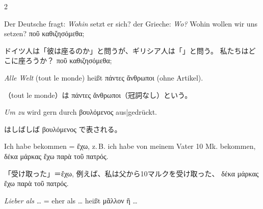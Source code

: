 \begin{paracol}{2}
\begin{enumerate}[leftmargin=0pt,rightmargin=0pt,listparindent =1cm,labelindent=1cm,labelsep=1ex,labelwidth={*},itemindent={*},align=left]
\begin{german}
\item Der Deutsche fragt: \emph{Wohin} setzt er sich? der Grieche: \emph{Wo?}
Wohin wollen wir uns setzen? \textgreek[variant=ancient]{ποῦ καθιζησόμεθα;}
\end{german}
\switchcolumn

\begin{japanese}
ドイツ人は「彼は\emph{}座るのか」と問うが、ギリシア人は「」と問う。
私たちはどこに座ろうか？ \textgreek[variant=ancient]{ποῦ καθιζησόμεθα;}
\end{japanese}
\switchcolumn*

\begin{german}
\item \emph{Alle Welt} \textfrench{(tout le monde)} heißt \textgreek[variant=ancient]{πάντες
ἄνθρωποι} (ohne Artikel).
\end{german}
\switchcolumn

\begin{japanese}
（\textfrench{tout le monde}）は
\textgreek[variant=ancient]{πάντες ἄνθρωποι}（冠詞なし）という。
\end{japanese}
\switchcolumn*

\begin{german}
\item \emph{Um zu} wird gern durch \textgreek[variant=ancient]{βουλόμενος}
aus|gedrückt.
\end{german}
\switchcolumn

\begin{japanese}
 はしばしば \textgreek[variant=ancient]{βουλόμενος} で表される。
\end{japanese}
\switchcolumn*

\begin{german}
\item Ich habe bekommen = \textgreek[variant=ancient]{ἔχω,} z.\,B. ich habe
von meinem Vater 10 Mk. bekommen, \textgreek[variant=ancient]{δέκα
μάρκας ἔχω παρὰ τοῦ πατρός.}
\end{german}
\switchcolumn

\begin{japanese}
「受け取った」＝\textgreek[variant=ancient]{ἔχω,} 例えば、私は父から10マルクを受け取った、
\textgreek[variant=ancient]{δέκα μάρκας ἔχω παρὰ τοῦ πατρός.}
\end{japanese}
\switchcolumn*

\begin{german}
\item \emph{Lieber als} \ldots{} = eher als \ldots{} heißt \textgreek[variant=ancient]{μᾶλλον
ἢ }\ldots{}
\end{german}
\switchcolumn


\end{enumerate}
\end{paracol}
